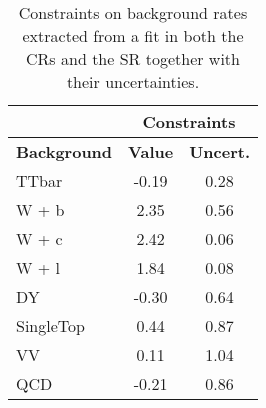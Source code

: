 \documentclass[10pt]{article}
\begin{document}
\begin{table}[!ht]
\begin{center}
\begin{tabular}{|l|c|c|}
\hline
\hline
& \multicolumn{2}{c|}{\textbf{Constraints}} \\
\hline
\hline
\textbf{Background} & \textbf{ Value} & \textbf{Uncert.} \\
\hline
TTbar            & -0.19 & 0.28    \\
W + b            &  2.35 & 0.56    \\
W + c            &  2.42 & 0.06    \\
W + l            &  1.84 & 0.08    \\
DY               & -0.30 & 0.64    \\
SingleTop        &  0.44 & 0.87    \\
VV               &  0.11 & 1.04    \\
QCD              & -0.21 & 0.86    \\
\hline
\hline

\hline
\hline
\end{tabular}
\caption{Constraints on background rates extracted from a fit in both the CRs and the SR together with their uncertainties.}
\label{tab:SFtable}
\end{center}
\end{table} 
\end{document}
